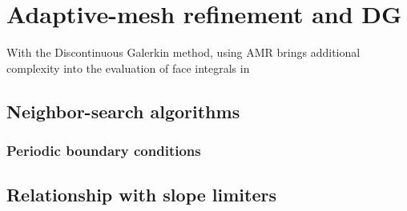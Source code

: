\section{Adaptive-mesh refinement and DG}
With the Discontinuous Galerkin method, using AMR brings additional complexity into the evaluation of face integrals in 
\subsection{Neighbor-search algorithms}
\subsubsection{Periodic boundary conditions}
\subsection{Relationship with slope limiters}